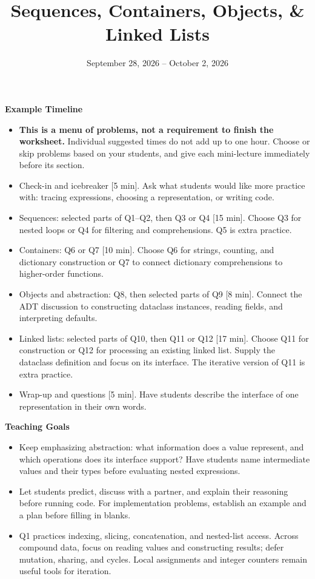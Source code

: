 \documentclass{exam}
\title{Sequences, Containers, Objects, \& Linked Lists}
\date{September 28, 2026 -- October 2, 2026}
\begin{document}
\maketitle

\begin{meta}
\small
\textbf{Example Timeline}
\begin{itemize}
    \item \textbf{This is a menu of problems, not a requirement to finish the worksheet.} Individual suggested times do not add up to one hour. Choose or skip problems based on your students, and give each mini-lecture immediately before its section.
    \item Check-in and icebreaker [5 min]. Ask what students would like more practice with: tracing expressions, choosing a representation, or writing code.
    \item Sequences: selected parts of Q1--Q2, then Q3 or Q4 [15 min]. Choose Q3 for nested loops or Q4 for filtering and comprehensions. Q5 is extra practice.
    \item Containers: Q6 or Q7 [10 min]. Choose Q6 for strings, counting, and dictionary construction or Q7 to connect dictionary comprehensions to higher-order functions.
    \item Objects and abstraction: Q8, then selected parts of Q9 [8 min]. Connect the ADT discussion to constructing dataclass instances, reading fields, and interpreting defaults.
    \item Linked lists: selected parts of Q10, then Q11 or Q12 [17 min]. Choose Q11 for construction or Q12 for processing an existing linked list. Supply the dataclass definition and focus on its interface. The iterative version of Q11 is extra practice.
    \item Wrap-up and questions [5 min]. Have students describe the interface of one representation in their own words.
\end{itemize}
\textbf{Teaching Goals}
\begin{itemize}
    \item Keep emphasizing abstraction: what information does a value represent, and which operations does its interface support? Have students name intermediate values and their types before evaluating nested expressions.
    \item Let students predict, discuss with a partner, and explain their reasoning before running code. For implementation problems, establish an example and a plan before filling in blanks.
    \item Q1 practices indexing, slicing, concatenation, and nested-list access. Across compound data, focus on reading values and constructing results; defer mutation, sharing, and cycles. Local assignments and integer counters remain useful tools for iteration.

\end{itemize}
\end{meta}
\end{document}
